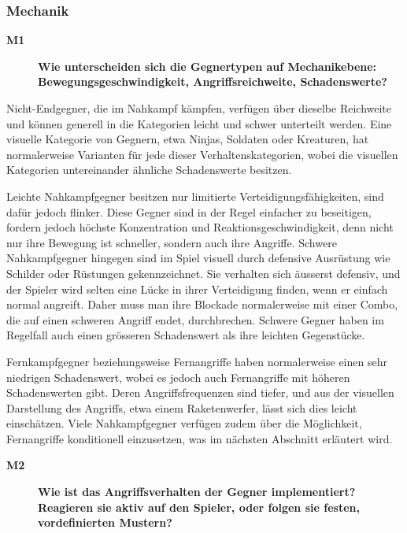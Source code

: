 \documentclass[../Main.tex]{subfiles}
\begin{document}
\subsubsection{Mechanik}

\begin{description}
    \item[\textbf{M1}] \textbf{Wie unterscheiden sich die Gegnertypen auf Mechanikebene: Bewegungsgeschwindigkeit, Angriffsreichweite, Schadenswerte?}
\end{description}

Nicht-Endgegner, die im Nahkampf kämpfen, verfügen über dieselbe Reichweite und können generell in die Kategorien leicht und schwer unterteilt werden. Eine visuelle Kategorie von Gegnern, etwa Ninjas, Soldaten oder Kreaturen, hat normalerweise Varianten für jede dieser Verhaltenskategorien, wobei die visuellen Kategorien untereinander ähnliche Schadenswerte besitzen.

Leichte Nahkampfgegner besitzen nur limitierte Verteidigungsfähigkeiten, sind dafür jedoch flinker. Diese Gegner sind in der Regel einfacher zu beseitigen, fordern jedoch höchste Konzentration und Reaktionsgeschwindigkeit, denn nicht nur ihre Bewegung ist schneller, sondern auch ihre Angriffe. Schwere Nahkampfgegner hingegen sind im Spiel visuell durch defensive Ausrüstung wie Schilder oder Rüstungen gekennzeichnet. Sie verhalten sich äusserst defensiv, und der Spieler wird selten eine Lücke in ihrer Verteidigung finden, wenn er einfach normal angreift. Daher muss man ihre Blockade normalerweise mit einer Combo, die auf einen schweren Angriff endet, durchbrechen. Schwere Gegner haben im Regelfall auch einen grösseren Schadenswert als ihre leichten Gegenstücke.

Fernkampfgegner beziehungsweise Fernangriffe haben normalerweise einen sehr niedrigen Schadenswert, wobei es jedoch auch Fernangriffe mit höheren Schadenswerten gibt. Deren Angriffsfrequenzen sind tiefer, und aus der visuellen Darstellung des Angriffs, etwa einem Raketenwerfer, lässt sich dies leicht einschätzen. Viele Nahkampfgegner verfügen zudem über die Möglichkeit, Fernangriffe konditionell einzusetzen, was im nächsten Abschnitt erläutert wird.

\begin{description}
    \item[\textbf{M2}] \textbf{Wie ist das Angriffsverhalten der Gegner implementiert? Reagieren sie aktiv auf den Spieler, oder folgen sie festen, vordefinierten Mustern?}
\end{description}
\end{document}
